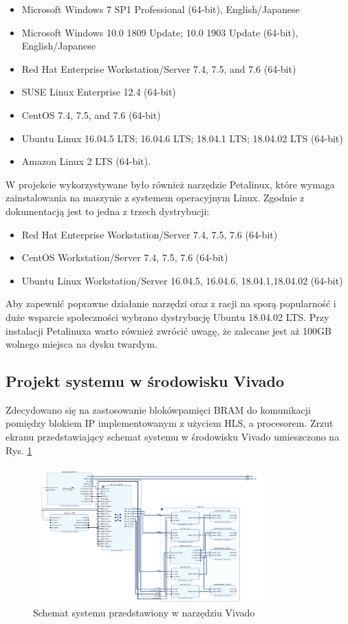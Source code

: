 \begin{itemize}
  \item Microsoft Windows 7 SP1 Professional (64-bit), English/Japanese 
  \item Microsoft Windows 10.0 1809 Update; 10.0 1903 Update (64-bit), English/Japanese
  \item Red Hat Enterprise Workstation/Server 7.4, 7.5, and 7.6 (64-bit)
  \item SUSE Linux Enterprise 12.4 (64-bit)
  \item CentOS 7.4, 7.5, and 7.6 (64-bit)
  \item Ubuntu Linux 16.04.5 LTS; 16.04.6 LTS; 18.04.1 LTS; 18.04.02 LTS (64-bit)
  \item Amazon Linux 2 LTS (64-bit).
\end{itemize}

\bigskip
W projekcie wykorzystywane było również narzędzie Petalinux, które wymaga 
zainstalowania na maszynie z systemem operacyjnym Linux. Zgodnie z 
dokumentacją\cite{PetalinuxGuide} jest to jedna z trzech dystrybucji:

\begin{itemize}
\item Red Hat Enterprise Workstation/Server 7.4, 7.5, 7.6 (64-bit)
\item CentOS Workstation/Server 7.4, 7.5, 7.6 (64-bit)
\item Ubuntu Linux Workstation/Server 16.04.5, 16.04.6, 18.04.1,18.04.02 (64-bit)
\end{itemize}

\bigskip
Aby zapewnić poprawne działanie narzędzi oraz z racji na sporą popularność i duże 
wsparcie społeczności wybrano dystrybucję Ubuntu 18.04.02 LTS. Przy instalacji 
Petalinuxa warto również zwrócić uwagę, że zalecane jest aż 100GB wolnego miejsca 
na dysku twardym. 

\subsection{Projekt systemu w środowisku Vivado}

Zdecydowano się na zastosowanie blokówpamięci BRAM do komunikacji pomiędzy 
blokiem IP implementowanym z użyciem HLS, a procesorem. Zrzut ekranu przedstawiający 
schemat systemu w środowisku Vivado umieszczono na Rys. \ref{vivado-block-design}

\begin{figure}
  \centering
  \includegraphics[width=0.8\textwidth]{img/vivado-block-design.png}
  \caption{Schemat systemu przedstawiony w narzędziu Vivado}
  \label{vivado-block-design}
\end{figure}



